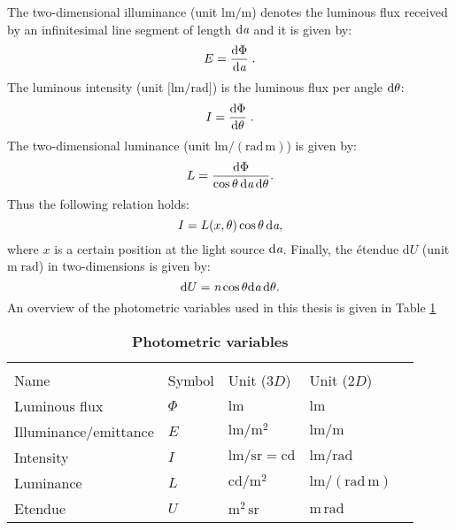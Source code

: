 The two-dimensional illuminance (unit $\textrm{lm}/\textrm{m}$) denotes the luminous flux received by an infinitesimal line segment of length $\textrm{d}\textit{a}$ 
and it is given by:
 \begin{equation}
 E=\frac{\textrm{d}\Phi}{\textrm{d}\textit{a}}\;.
 \end{equation}
The luminous intensity \big(unit $\big[\textrm{lm}/\textrm{rad}\big]$\big) is the luminous flux per angle $\textrm{d}\theta$:
 \begin{equation}
 I=\frac{\textrm{d}\Phi}{\textrm{d}\theta}\;.
 \end{equation}
 The two-dimensional luminance (unit $\textrm{lm}/(\textrm{rad}\,\textrm{m})$) is given by:
 \begin{equation}
 L= \frac{\textrm {d}\Phi}{\cos\theta\,\textrm{d}\textit{a} \,\textrm{d}\theta}.
 \end{equation}
 Thus the following relation holds:
 \begin{equation}
 I = L(x, \theta)\cos\theta\,\textrm{d}\textit{a},
 \end{equation}
where $x$ is a certain position at the light source $\textrm{d}\textit{a}$. 
 Finally, the \'{e}tendue $\textrm{d}U $ (unit $\textrm{m}\;\textrm{rad}$) in two-dimensions is given by:
\begin{equation}\label{etendue2d}
\textrm{d}U = \textit{n}\cos\theta\textrm{d}\textit{a}\,\textrm{d}\theta.
\end{equation}
An overview of the photometric variables used in this thesis is given in Table \ref{tab:photometric_variables}
\begin{table}[t] 
\centering
\caption{\bf Photometric variables}
\begin{tabular}{lllll}
 \hline   \\
Name  & Symbol & Unit ($3D$) & Unit ($2D$) \\
  \hline 
Luminous flux & $\Phi$   & $\textrm{lm}$   &  $\textrm{lm}$ \\
Illuminance/emittance  & $E$    & $\textrm{lm}/{\textrm{m}^2} $ & $\textrm{lm}/{\textrm{m}}$  \\
Intensity  & $I$    & $\textrm{lm}/{\textrm{sr}} = \textrm{cd}$  & $\textrm{lm}/\textrm{rad}$ \\
Luminance  & $L$  & $ \textrm{cd}/{\textrm{m}^2}$   & $\textrm{lm}/(\textrm{rad} \,\textrm{m})$ \\
Etendue & $U$  & $\textrm{m}^2\, \textrm{sr}$   & $\textrm{m}\, \textrm{rad}$ \\
 \hline
 \end{tabular}
\label{tab:photometric_variables}
 \end{table}
